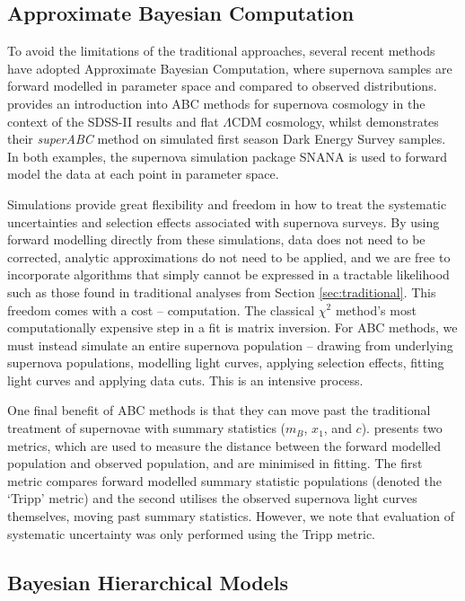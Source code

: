 \documentclass[a4paper,fleqn,usenatbib,manuscript]{emulateapj}
\begin{document}
\subsection{Approximate Bayesian Computation}

To avoid the limitations of the traditional approaches, several recent methods have adopted Approximate Bayesian Computation, where supernova samples are forward modelled in parameter space and compared to observed distributions. \citet{Weyant2013} provides an introduction into ABC methods for supernova cosmology in the context of the SDSS-II results \citep{Sako2014} and flat $\Lambda$CDM cosmology, whilst \citet{Jennings2016} demonstrates their \textit{superABC} method on simulated first season Dark Energy Survey samples. In both examples, the supernova simulation package SNANA \citep{Kessler2009a} is used to forward model the data at each point in parameter space.

Simulations provide great flexibility and freedom in how to treat the systematic uncertainties and selection effects associated with supernova surveys. By using forward modelling directly from these simulations, data does not need to be corrected, analytic approximations do not need to be applied, and we are free to incorporate algorithms that simply cannot be expressed in a tractable likelihood such as those found in traditional analyses from Section \ref{sec:traditional}. This freedom comes with a cost -- computation. The classical $\chi^2$ method's most computationally expensive step in a fit is matrix inversion. For ABC methods, we must instead simulate an entire supernova population -- drawing from underlying supernova populations, modelling light curves, applying selection effects, fitting light curves and applying data cuts. This is an intensive process.

One final benefit of ABC methods is that they can move past the traditional treatment of supernovae with summary statistics ($m_B$, $x_1$, and $c$). \citet{Jennings2016} presents two metrics, which are used to measure the distance between the forward modelled population and observed population, and are minimised in fitting. The first metric compares forward modelled summary statistic populations (denoted the `Tripp' metric) and the second utilises the observed supernova light curves themselves, moving past summary statistics. However, we note that evaluation of systematic uncertainty was only performed using the Tripp metric.

\subsection{Bayesian Hierarchical Models}
\end{document}
